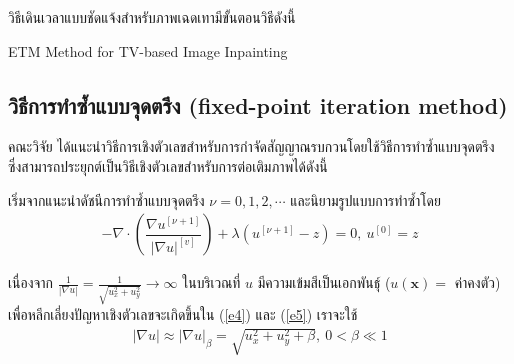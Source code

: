  \vspace{0.5cm} \hspace{0.5cm}วิธีเดินเวลาแบบชัดแจ้งสำหรับภาพเฉดเทามีขั้นตอนวิธีดังนี้  \\
 \vspace{0.5cm} 

 \begin{algorithm}[H]
    \caption{ETM Method for TV-based Image Inpainting}		
    \SetAlgoNoLine 
\end{algorithm}

\subsection{วิธีการทำซ้ำแบบจุดตรึง (fixed-point iteration method) }

\hspace{1cm} คณะวิจัย \cite{ref:FixpointSolver} ได้แนะนำวิธีการเชิงตัวเลขสำหรับการกำจัดสัญญาณรบกวนโดยใช้วิธีการทำซ้ำแบบจุดตรึง ซึ่งสามารถประยุกต์เป็นวิธีเชิงตัวเลขสำหรับการต่อเติมภาพได้ดังนี้
	
	\hspace{1cm} เริ่มจากแนะนำดัชนีการทำซ้ำแบบจุดตรึง $\nu=0,1,2,\cdots$ และนิยามรูปแบบการทำซ้ำโดย
	\begin{align}
	- \nabla\cdot\left(\dfrac{\nabla u^{[\nu+1]}}{{| \nabla u |}^{[v]} }\right) + \lambda(u^{[\nu+1]}-z)  = 0,\ u^{[0]}=z
	\label{e5}
	\end{align}

\hspace{1cm} เนื่องจาก $\tfrac{1}{| \nabla u |}=\tfrac{1}{\sqrt{u_x^2+u_y^2}} \rightarrow \infty$ ในบริเวณที่ $u$ มีความเข้มสีเป็นเอกพันธ์ุ ($u(\mathbf{x})=$ ค่าคงตัว) เพื่อหลีกเลี่ยงปัญหาเชิงตัวเลขจะเกิดขึ้นใน (\ref{e4}) และ (\ref{e5}) เราจะใช้ 
\begin{align*}
|\nabla u| \approx| \nabla u |_\beta=\sqrt{u_x^2+u_y^2+\beta},\ 0< \beta \ll 1
 \end{align*}

